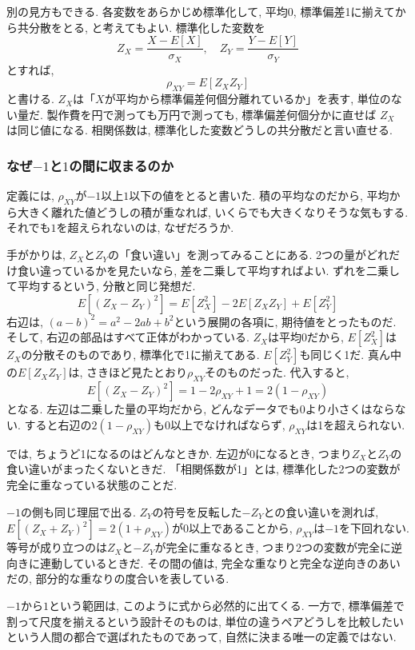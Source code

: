 別の見方もできる.
各変数をあらかじめ標準化して, 平均0, 標準偏差1に揃えてから共分散をとる, と考えてもよい.
標準化した変数を
\[
Z_X = \frac{X - E[X]}{\sigma_X}, \quad Z_Y = \frac{Y - E[Y]}{\sigma_Y}
\]
とすれば,
\[
\rho_{XY} = E[Z_X Z_Y]
\]
と書ける.
$Z_X$は「$X$が平均から標準偏差何個分離れているか」を表す, 単位のない量だ.
製作費を円で測っても万円で測っても, 標準偏差何個分かに直せば $Z_X$ は同じ値になる.
相関係数は, 標準化した変数どうしの共分散だと言い直せる.

\subsubsection*{なぜ\texorpdfstring{$-1$}{-1}と\texorpdfstring{$1$}{1}の間に収まるのか}

定義には, $\rho_{XY}$が$-1$以上$1$以下の値をとると書いた.
積の平均なのだから, 平均から大きく離れた値どうしの積が重なれば, いくらでも大きくなりそうな気もする.
それでも$1$を超えられないのは, なぜだろうか.

手がかりは, $Z_X$と$Z_Y$の「食い違い」を測ってみることにある.
2つの量がどれだけ食い違っているかを見たいなら, 差を二乗して平均すればよい.
ずれを二乗して平均するという, 分散と同じ発想だ.
\[
E[(Z_X - Z_Y)^2] = E[Z_X^2] - 2E[Z_X Z_Y] + E[Z_Y^2]
\]
右辺は, $(a-b)^2 = a^2 - 2ab + b^2$という展開の各項に, 期待値をとったものだ.
そして, 右辺の部品はすべて正体がわかっている.
$Z_X$は平均0だから, $E[Z_X^2]$は$Z_X$の分散そのものであり, 標準化で1に揃えてある.
$E[Z_Y^2]$も同じく1だ.
真ん中の$E[Z_X Z_Y]$は, さきほど見たとおり$\rho_{XY}$そのものだった.
代入すると,
\[
E[(Z_X - Z_Y)^2] = 1 - 2\rho_{XY} + 1 = 2(1 - \rho_{XY})
\]
となる.
左辺は二乗した量の平均だから, どんなデータでも0より小さくはならない.
すると右辺の$2(1 - \rho_{XY})$も0以上でなければならず, $\rho_{XY}$は1を超えられない.

では, ちょうど1になるのはどんなときか.
左辺が0になるとき, つまり$Z_X$と$Z_Y$の食い違いがまったくないときだ.
「相関係数が1」とは, 標準化した2つの変数が完全に重なっている状態のことだ.

$-1$の側も同じ理屈で出る.
$Z_Y$の符号を反転した$-Z_Y$との食い違いを測れば, $E[(Z_X + Z_Y)^2] = 2(1 + \rho_{XY})$が0以上であることから, $\rho_{XY}$は$-1$を下回れない.
等号が成り立つのは$Z_X$と$-Z_Y$が完全に重なるとき, つまり2つの変数が完全に逆向きに連動しているときだ.
その間の値は, 完全な重なりと完全な逆向きのあいだの, 部分的な重なりの度合いを表している.

$-1$から$1$という範囲は, このように式から必然的に出てくる.
一方で, 標準偏差で割って尺度を揃えるという設計そのものは, 単位の違うペアどうしを比較したいという人間の都合で選ばれたものであって, 自然に決まる唯一の定義ではない.

